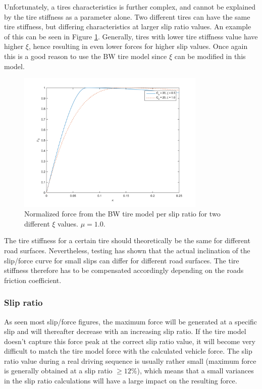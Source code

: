 Unfortunately, a tires characteristics is further complex, and cannot be explained by the tire stiffness as a parameter alone. Two different tires can have the same tire stiffness, but differing characteristics at larger slip ratio values. An example of this can be seen in Figure \ref{different_xsi}. Generally, tires with lower tire stiffness value have higher $ \xi $, hence resulting in even lower forces for higher slip values. Once again this is a good reason to use the BW tire model since $ \xi $ can be modified in this model.

\begin{figure}[h]
	\centering
	\includegraphics[width=0.8\textwidth]{Pictures/slipkraft_olika_xsi}
	\caption {Normalized force from the BW tire model per slip ratio for two different $ \xi $ values. $ \mu = 1.0 $.}
	\label{different_xsi}
\end{figure}

The tire stiffness for a certain tire should theoretically be the same for different road surfaces. Nevertheless, testing has shown that the actual inclination of the slip/force curve for small slips can differ for different road surfaces. The tire stiffness therefore has to be compensated accordingly depending on the roads friction coefficient.

\subsubsection{Slip ratio}
As seen most slip/force figures, the maximum force will be generated at a specific slip and will thereafter decrease with an increasing slip ratio. If the tire model doesn't capture this force peak at the correct slip ratio value, it will become very difficult to match the tire model force with the calculated vehicle force. The slip ratio value during a real driving sequence is usually rather small (maximum force is generally obtained at a slip ratio $ \geq 12 \% $), which means that a small variances in the slip ratio calculations will have a large impact on the resulting force.

